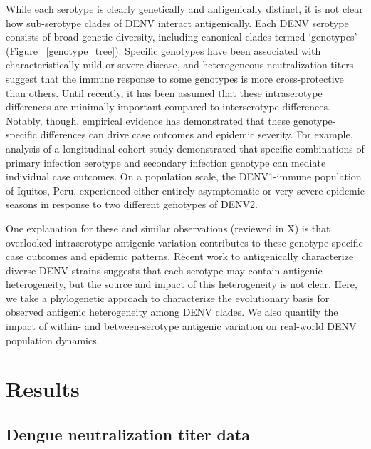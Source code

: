 \documentclass[11pt,oneside,letterpaper]{article}
\begin{document}
While each serotype is clearly genetically and antigenically distinct, it is not clear how sub-serotype clades of DENV interact antigenically.
Each DENV serotype consists of broad genetic diversity, including canonical clades termed `genotypes' (Figure ~\ref{genotype_tree}).
Specific genotypes have been associated with characteristically mild or severe disease, and heterogeneous neutralization titers suggest that the immune response to some genotypes is more cross-protective than others.
Until recently, it has been assumed that these intraserotype differences are minimally important compared to interserotype differences.
Notably, though, empirical evidence has demonstrated that these genotype-specific differences can drive case outcomes and epidemic severity.
For example, analysis of a longitudinal cohort study demonstrated that specific combinations of primary infection serotype and secondary infection genotype can mediate individual case outcomes.
On a population scale, the DENV1-immune population of Iquitos, Peru, experienced either entirely asymptomatic or very severe epidemic seasons in response to two different genotypes of DENV2.

One explanation for these and similar observations (reviewed in X) is that overlooked intraserotype antigenic variation contributes to these genotype-specific case outcomes and epidemic patterns.
Recent work to antigenically characterize diverse DENV strains suggests that each serotype may contain antigenic heterogeneity, but the source and impact of this heterogeneity is not clear.
Here, we take a phylogenetic approach to characterize the evolutionary basis for observed antigenic heterogeneity among DENV clades.
We also quantify the impact of within- and between-serotype antigenic variation on real-world DENV population dynamics.

\section*{Results}

\subsection{Dengue neutralization titer data}
\end{document}
